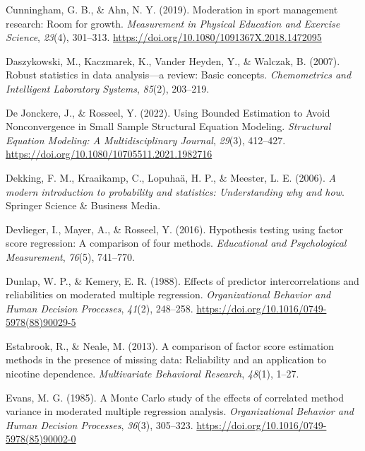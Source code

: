 \documentclass[
  man]{apa6}
\newlength{\cslhangindent}
\newenvironment{CSLReferences}[2] %
 {\begin{list}{}{%
  \setlength{\itemindent}{0pt}
  \setlength{\leftmargin}{0pt}
  \setlength{\parsep}{0pt}
  \ifodd #1
   \setlength{\leftmargin}{\cslhangindent}
   \setlength{\itemindent}{-1\cslhangindent}
  \fi
  \setlength{\itemsep}{#2\baselineskip}}}
 {\end{list}}
\begin{document}
\begin{CSLReferences}{1}{0}
Cunningham, G. B., \& Ahn, N. Y. (2019). Moderation in sport management research: {Room} for growth. \emph{Measurement in Physical Education and Exercise Science}, \emph{23}(4), 301--313. \url{https://doi.org/10.1080/1091367X.2018.1472095}

Daszykowski, M., Kaczmarek, K., Vander Heyden, Y., \& Walczak, B. (2007). Robust statistics in data analysis---a review: Basic concepts. \emph{Chemometrics and Intelligent Laboratory Systems}, \emph{85}(2), 203--219.

De Jonckere, J., \& Rosseel, Y. (2022). Using {Bounded Estimation} to {Avoid Nonconvergence} in {Small Sample Structural Equation Modeling}. \emph{Structural Equation Modeling: A Multidisciplinary Journal}, \emph{29}(3), 412--427. \url{https://doi.org/10.1080/10705511.2021.1982716}

Dekking, F. M., Kraaikamp, C., Lopuhaä, H. P., \& Meester, L. E. (2006). \emph{A modern introduction to probability and statistics: Understanding why and how}. Springer Science \& Business Media.

Devlieger, I., Mayer, A., \& Rosseel, Y. (2016). Hypothesis testing using factor score regression: A comparison of four methods. \emph{Educational and Psychological Measurement}, \emph{76}(5), 741--770.

Dunlap, W. P., \& Kemery, E. R. (1988). Effects of predictor intercorrelations and reliabilities on moderated multiple regression. \emph{Organizational Behavior and Human Decision Processes}, \emph{41}(2), 248--258. \url{https://doi.org/10.1016/0749-5978(88)90029-5}

Estabrook, R., \& Neale, M. (2013). A comparison of factor score estimation methods in the presence of missing data: Reliability and an application to nicotine dependence. \emph{Multivariate Behavioral Research}, \emph{48}(1), 1--27.

Evans, M. G. (1985). A {Monte Carlo} study of the effects of correlated method variance in moderated multiple regression analysis. \emph{Organizational Behavior and Human Decision Processes}, \emph{36}(3), 305--323. \url{https://doi.org/10.1016/0749-5978(85)90002-0}


\end{CSLReferences}
\end{document}
